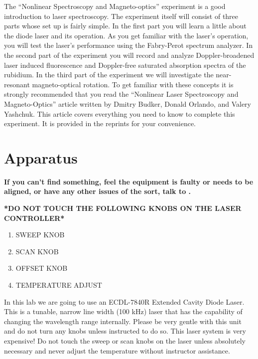 \documentclass{../lab}
\begin{document}
The ``Nonlinear Spectroscopy and Magneto-optics'' experiment is a good introduction to laser spectroscopy. The experiment itself will consist of three parts whose set up is fairly simple. In the first part you will learn a little about the diode laser and its operation. As you get familiar with the laser's operation, you will test the laser's performance using the Fabry-Perot spectrum analyzer. In the second part of the experiment you will record and analyze Doppler-broadened laser induced fluorescence and Doppler-free saturated absorption spectra of the rubidium. In the third part of the experiment we will investigate the near-resonant magneto-optical rotation. To get familiar with these concepts it is strongly recommended that you read the ``Nonlinear Laser Spectroscopy and Magneto-Optics'' article written by Dmitry Budker, Donald Orlando, and Valery Yashchuk. This article covers everything you need to know to complete this experiment. It is provided in the reprints for your convenience.

\section{Apparatus}

\textbf{If you can't find something, feel the equipment is faulty or needs to be aligned, or have any other issues of the sort, talk to \LabEngineer. }

\textbf{*DO NOT TOUCH THE FOLLOWING KNOBS ON THE LASER CONTROLLER*}

\begin{enumerate}
    \item SWEEP KNOB

    \item SCAN KNOB

    \item OFFSET KNOB

    \item TEMPERATURE ADJUST

\end{enumerate}

\newpage

In this lab we are going to use an ECDL-7840R Extended Cavity Diode Laser. This is a tunable, narrow line width (100 kHz) laser that has the capability of changing the wavelength range internally. Please be very gentle with this unit and do not turn any knobs unless instructed to do so. This laser system is very expensive! Do not touch the sweep or scan knobs on the laser unless absolutely necessary and never adjust the temperature without instructor assistance.
\end{document}
